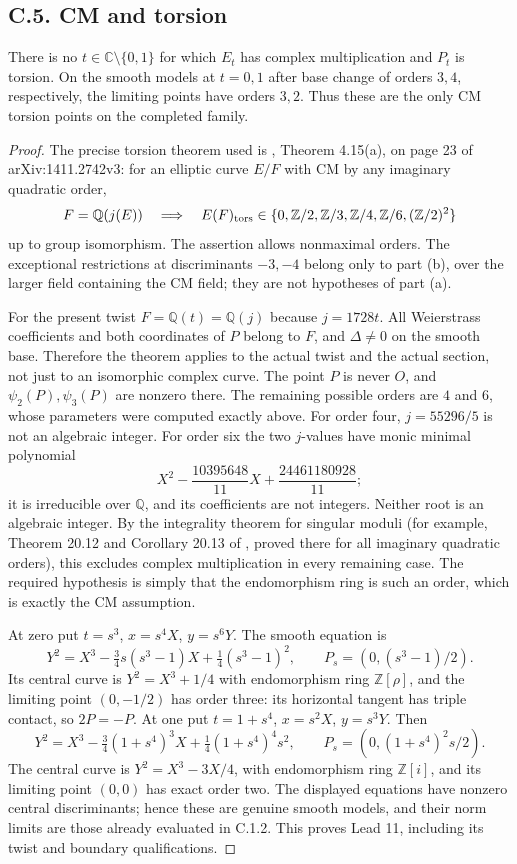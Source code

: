 \subsection{C.5. CM and torsion}
\begin{statement}
There is no $t\in\mathbb C\setminus\{0,1\}$ for which $E_t$ has
complex multiplication and $P_t$ is torsion. On the smooth models
at $t=0,1$ after base change of orders $3,4$, respectively, the
limiting points have orders $3,2$. Thus these are the only CM
torsion points on the completed family.
\end{statement}
\begin{proof}
The precise torsion theorem used is \cite{BourdonClarkStankewicz2017},
Theorem 4.15(a), on page 23 of arXiv:1411.2742v3:
for an elliptic curve $E/F$ with CM by any imaginary quadratic order,
\[
 F=\mathbb Q(j(E))\quad\Longrightarrow\quad
 E(F)_{\rm tors}\in
 \{0,\mathbb Z/2,\mathbb Z/3,\mathbb Z/4,
       \mathbb Z/6,(\mathbb Z/2)^2\}
\]
up to group isomorphism. The assertion allows nonmaximal orders.
The exceptional restrictions at discriminants $-3,-4$ belong only
to part (b), over the larger field containing the CM field; they
are not hypotheses of part (a).

For the present twist $F=\mathbb Q(t)=\mathbb Q(j)$ because
$j=1728t$. All Weierstrass coefficients and both coordinates of
$P$ belong to $F$, and $\Delta\ne0$ on the smooth base. Therefore
the theorem applies to the actual twist and the actual section,
not just to an isomorphic complex curve. The point $P$ is never
$O$, and $\psi_2(P),\psi_3(P)$ are nonzero there. The remaining
possible orders are $4$ and $6$, whose parameters were computed
exactly above. For order four, $j=55296/5$ is not an algebraic
integer. For order six the two $j$-values have monic minimal
polynomial
\[
 X^2-\frac{10395648}{11}X+\frac{24461180928}{11};
\]
it is irreducible over $\mathbb Q$, and its coefficients are not
integers. Neither root is an algebraic integer. By the integrality
theorem for singular moduli (for example, Theorem 20.12 and
Corollary 20.13 of \cite{Sutherland2023CM}, proved there for all
imaginary quadratic orders), this excludes complex multiplication
in every remaining case. The required hypothesis is simply that
the endomorphism ring is such an order, which is exactly the CM
assumption.

At zero put $t=s^3$, $x=s^4X$, $y=s^6Y$. The smooth equation is
\[
 Y^2=X^3-\tfrac34s(s^3-1)X+\tfrac14(s^3-1)^2,\qquad
 P_s=(0,(s^3-1)/2).
\]
Its central curve is $Y^2=X^3+1/4$ with endomorphism ring
$\mathbb Z[\rho]$, and the limiting point $(0,-1/2)$ has order
three: its horizontal tangent has triple contact, so $2P=-P$.
At one put $t=1+s^4$, $x=s^2X$, $y=s^3Y$. Then
\[
 Y^2=X^3-\tfrac34(1+s^4)^3X+
       \tfrac14(1+s^4)^4s^2,\qquad
 P_s=(0,(1+s^4)^2s/2).
\]
The central curve is $Y^2=X^3-3X/4$, with endomorphism ring
$\mathbb Z[i]$, and its limiting point $(0,0)$ has exact order two.
The displayed equations have nonzero central discriminants; hence
these are genuine smooth models, and their norm limits are those
already evaluated in C.1.2. This proves Lead 11, including its
twist and boundary qualifications.
\end{proof}
